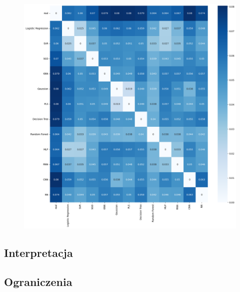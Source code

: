 \begin{figure}[H]
    \centering
    \includegraphics[width=\textwidth]{images/mae_matrix.png}
    \caption{}
    \label{mae-matrix}
\end{figure}


\subsection{Interpretacja}

\subsection{Ograniczenia}
